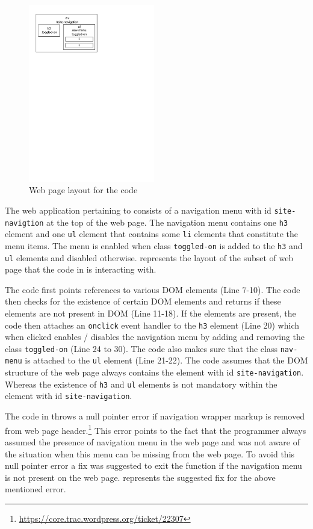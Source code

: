 	\begin{figure}
		\centering
		\includegraphics[width=55mm]{images/layout.pdf}
		\caption{Web page layout for the \javascript code}
		\label{Fig:Layout}
	\end{figure}
	
	The web application pertaining to  consists of a navigation menu with id \texttt{site-navigtion} at the top of the web page. The navigation menu contains one \texttt{h3} element and one \texttt{ul} element that contains some \texttt{li} elements that constitute the menu items. The menu is enabled when class \texttt{toggled-on} is added to the \texttt{h3} and \texttt{ul} elements and disabled otherwise.  represents the layout of the subset of web page that the \javascript code in  is interacting with.
	
	The \javascript code first points references to various DOM elements (Line 7-10). The code then checks for the existence of certain DOM elements and returns if these elements are not present in DOM (Line 11-18). If the elements are present, the code then attaches an \texttt{onclick} event handler to the \texttt{h3} element (Line 20) which when clicked enables / disables the navigation menu by adding and removing the class \texttt{toggled-on} (Line 24 to 30). The code also makes sure that the class \texttt{nav-menu} is attached to the \texttt{ul} element (Line 21-22). The \javascript code assumes that the DOM structure of the web page always contains the element with id \texttt{site-navigation}. Whereas the existence of \texttt{h3} and \texttt{ul} elements is not mandatory within the element with id \texttt{site-navigation}.
	
	The \javascript code in  throws a null pointer error if navigation wrapper markup is removed from web page header.\footnote{\url{https://core.trac.wordpress.org/ticket/22307}} This error points to the fact that the programmer always assumed the presence of navigation menu in the web page and was not aware of the situation when this menu can be missing from the web page. To avoid this null pointer error a fix was suggested to exit the function if the navigation menu is not present on the web page.  represents the suggested fix for the above mentioned error.
	
